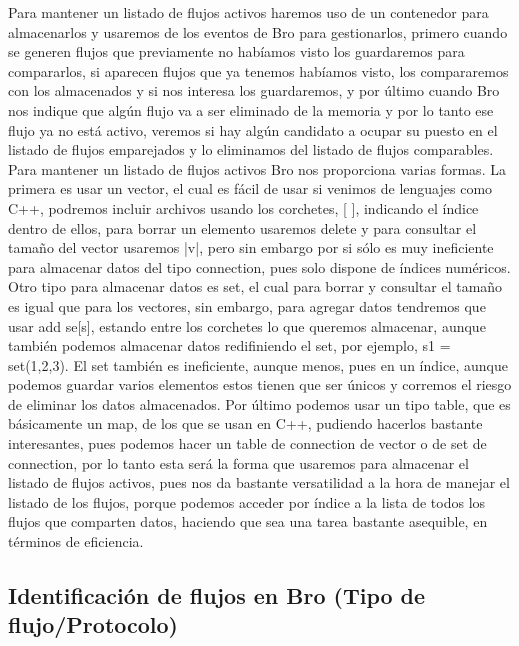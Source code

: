 {{{Para mantener un listado de flujos activos haremos uso de un contenedor para 
almacenarlos y usaremos de los eventos de Bro para gestionarlos, primero cuando 
se generen flujos que previamente no habíamos visto los guardaremos para compararlos, 
si aparecen flujos que ya tenemos habíamos visto, los compararemos con los almacenados 
y si nos interesa los guardaremos, y por último cuando Bro nos indique que algún flujo 
va a ser eliminado de la memoria y por lo tanto ese flujo ya no está activo, veremos 
si hay algún candidato a ocupar su puesto en el listado de flujos emparejados y lo 
eliminamos del listado de flujos comparables.
\intro
Para mantener un listado de flujos activos Bro nos proporciona varias formas. La 
primera es usar un vector, el cual es fácil de usar si venimos de lenguajes como C++, 
podremos incluir archivos usando los corchetes, [ ], indicando el índice dentro 
de ellos, para borrar un elemento usaremos delete y para consultar el tamaño del 
vector usaremos |v|, pero sin embargo por si sólo es muy ineficiente para almacenar 
datos del tipo connection, pues solo dispone de índices numéricos.
\intro
Otro tipo para almacenar datos es set, el cual para borrar y consultar el tamaño 
es igual que para los vectores, sin embargo, para agregar datos tendremos que usar add se[s], 
estando entre los corchetes lo que queremos almacenar, aunque también podemos 
almacenar datos redifiniendo el set, por ejemplo, s1 = set(1,2,3). El set también 
es ineficiente, aunque menos, pues en un índice, aunque podemos guardar varios 
elementos estos tienen que ser únicos y corremos el riesgo de eliminar los datos almacenados.
\intro
Por último podemos usar un tipo table, que es básicamente un map, de los que se 
usan en C++, pudiendo hacerlos bastante interesantes, pues podemos hacer un table 
de connection de vector o de set de connection, por lo tanto esta será la forma 
que usaremos para almacenar el listado de flujos activos, pues nos da bastante 
versatilidad a la hora de manejar el listado de los flujos, porque podemos 
acceder por índice a la lista de todos los flujos que comparten datos, haciendo 
que sea una tarea bastante asequible, en términos de eficiencia.

\subsection{Identificación de flujos en Bro (Tipo de flujo/Protocolo)}

}}}
